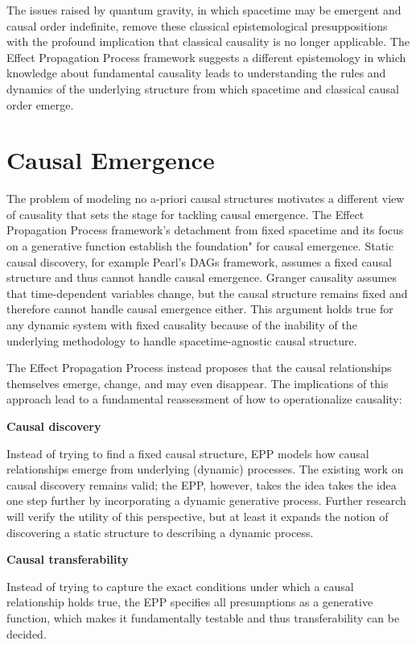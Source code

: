 \documentclass{article}
\begin{document}
The issues raised by quantum gravity, in which spacetime may be emergent and causal order indefinite, remove these classical epistemological presuppositions with the profound implication that classical causality is no longer applicable. The Effect Propagation Process framework suggests a different epistemology in which knowledge about fundamental causality leads to understanding the rules and dynamics of the underlying structure from which spacetime and classical causal order emerge.

\newpage

\section{Causal Emergence}
\label{sec:causal_emergence}

The problem of modeling no a-priori causal structures motivates a different view of causality that sets the stage for tackling  causal emergence. The Effect Propagation Process framework's detachment from fixed spacetime and its focus on a generative function establish the foundation" for causal emergence. Static causal discovery, for example Pearl’s DAGs framework, assumes a fixed causal structure and thus cannot handle causal emergence. Granger causality assumes that time-dependent variables change, but the causal structure remains fixed and therefore cannot handle causal emergence either. This argument holds true for any dynamic system with fixed causality because of the inability of the underlying methodology to handle spacetime-agnostic causal structure.

The Effect Propagation Process instead proposes that the causal relationships themselves emerge, change, and may even disappear.  The implications of this approach lead to a fundamental reassessment of how to operationalize causality:

\textbf{Causal discovery}

Instead of trying to find a fixed causal structure, EPP models how causal relationships emerge from underlying (dynamic) processes. The existing work on causal discovery remains valid; the EPP, however, takes the idea takes the idea one step further by incorporating a dynamic generative process. Further research will verify the utility of this perspective, but at least it expands the notion of discovering a static structure to describing a dynamic process.

\textbf{Causal transferability}

Instead of trying to capture the exact conditions under which a causal relationship holds true, the EPP specifies all presumptions as a generative function, which makes it fundamentally testable and thus transferability can be decided.
\end{document}
